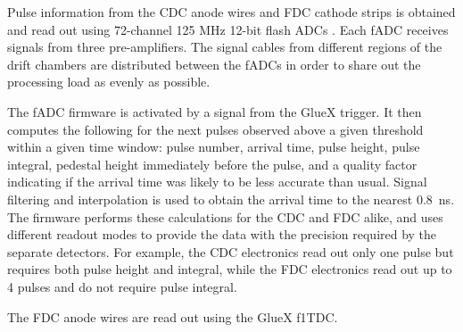 Pulse information from the CDC anode wires and FDC cathode strips is obtained and read out using 72-channel 125 MHz 12-bit flash ADCs \cite{Visser2008,5873864}. 
Each fADC receives signals from three pre-amplifiers. 
The signal cables from different regions of the drift chambers are distributed between the fADCs in order to share out the processing load as evenly as possible.  

The fADC firmware is activated by a signal from the GlueX trigger. It then computes the following for the next pulses observed above a given threshold within a given time window: pulse number, arrival time, pulse height, pulse integral, pedestal height immediately before the pulse, and a quality factor indicating if the arrival time was likely to be less accurate than usual. 
Signal filtering and interpolation is used to obtain the arrival time to the nearest 0.8~ns. 
The firmware performs these calculations for the CDC and FDC alike, and uses different readout modes to provide the data with the precision required by the separate detectors. 
For example, the CDC electronics read out only one pulse but requires both pulse height and integral, while the FDC electronics read out up to 4 pulses and do not require pulse integral.  


The FDC anode wires are read out using the GlueX f1TDC\cite{JLAB2002}. 



